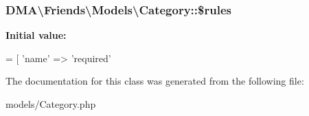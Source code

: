 \subsubsection[{\$rules}]{\setlength{\rightskip}{0pt plus 5cm}D\+M\+A\textbackslash{}\+Friends\textbackslash{}\+Models\textbackslash{}\+Category\+::\$rules}\label{classDMA_1_1Friends_1_1Models_1_1Category_ad99b16f55603d86e0a22fa60c22c7300}
{\bfseries Initial value\+:}
\begin{DoxyCode}
= [ 
        \textcolor{stringliteral}{'name'} => \textcolor{stringliteral}{'required'}
\end{DoxyCode}


The documentation for this class was generated from the following file\+:\begin{DoxyCompactItemize}
\item 
models/Category.\+php\end{DoxyCompactItemize}
